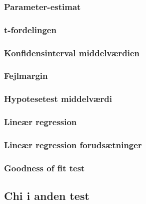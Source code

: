 \documentclass[]{book}
\begin{document}
\hypertarget{parameter-estimat}{%
\subsubsection{Parameter-estimat}\label{parameter-estimat}}

\hypertarget{t-fordelingen}{%
\subsubsection{t-fordelingen}\label{t-fordelingen}}

\hypertarget{konfidensinterval-middelvrdien}{%
\subsubsection{Konfidensinterval
middelværdien}\label{konfidensinterval-middelvrdien}}

\hypertarget{fejlmargin}{%
\subsubsection{Fejlmargin}\label{fejlmargin}}

\hypertarget{hypotesetest-middelvrdi}{%
\subsubsection{Hypotesetest middelværdi}\label{hypotesetest-middelvrdi}}

\hypertarget{liner-regression}{%
\subsubsection{Lineær regression}\label{liner-regression}}

\hypertarget{liner-regression-forudstninger}{%
\subsubsection{Lineær regression
forudsætninger}\label{liner-regression-forudstninger}}

\hypertarget{goodness-of-fit-test}{%
\subsubsection{Goodness of fit test}\label{goodness-of-fit-test}}

\hypertarget{chi-i-anden-test}{%
\subsection{Chi i anden test}\label{chi-i-anden-test}}
\end{document}
